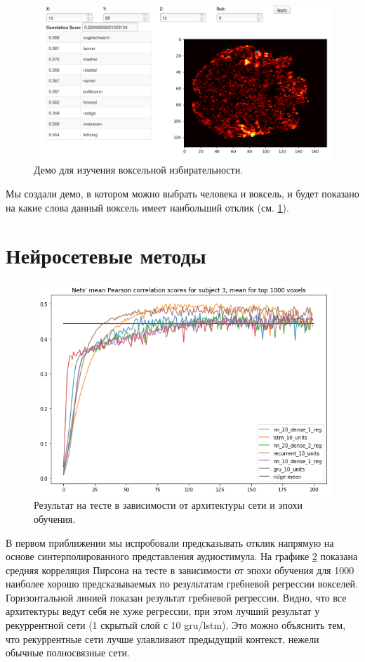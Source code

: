 \documentclass[pdftex,ptm,12pt,a4paper]{report}
\theoremstyle{definition}
\begin{document}
\begin{figure}[h]
\centering
\includegraphics[scale=0.45]{images/demo.png}
\caption{Демо для изучения воксельной избирательности.}
\label{demo}
\end{figure}

Мы создали демо, в котором можно выбрать человека и воксель, и будет показано на какие слова данный воксель имеет наибольший отклик (см. \ref{demo}).

\section{Нейросетевые методы}

\begin{figure}[h]
\centering
\includegraphics[scale=0.5]{graphics/sub3_net.png}
\caption{Результат на тесте в зависимости от архитектуры сети и эпохи обучения.}
\label{nets_scores}
\end{figure}

В первом приближении мы испробовали предсказывать отклик напрямую на основе синтерполированного представления аудиостимула. На графике \ref{nets_scores} показана средняя корреляция Пирсона на тесте в зависимости от эпохи обучения для 1000 наиболее хорошо предсказываемых по результатам гребневой регрессии вокселей. Горизонтальной линией показан результат гребневой регрессии. Видно, что все архитектуры ведут себя не хуже регрессии, при этом лучший результат у рекуррентной сети (1 скрытый слой с 10 gru/lstm). Это можно объяснить тем, что рекуррентные сети лучше улавливают предыдущий контекст, нежели обычные полносвязные сети.
\end{document}
